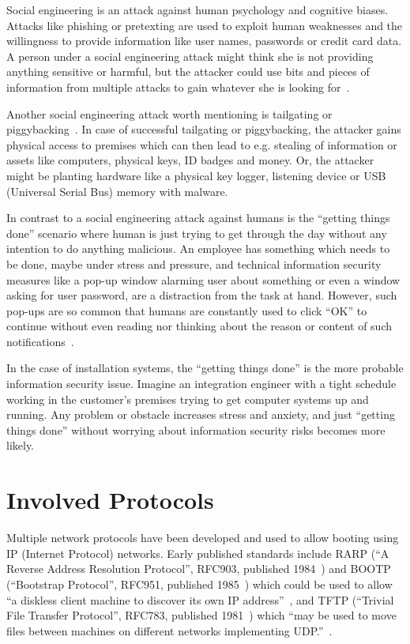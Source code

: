 Social engineering is an attack against human psychology and cognitive
biases. Attacks like phishing or pretexting are used to exploit human
weaknesses and the willingness to provide information like user names,
passwords or credit card data. A person under a social engineering
attack might think she is not providing anything sensitive or harmful,
but the attacker could use bits and pieces of information from
multiple attacks to gain whatever she is looking
for~\cite{greavu2014social}\cite{anderson}.

Another social engineering attack worth mentioning is tailgating or
piggybacking~\cite{fairbrother2014insider}. In case of successful
tailgating or piggybacking, the attacker gains physical access to
premises which can then lead to e.g. stealing of information or assets
like computers, physical keys, ID badges and money. Or, the attacker
might be planting hardware like a physical key logger, listening
device or USB (Universal Serial Bus) memory with malware.

In contrast to a social engineering attack against humans is the
``getting things done'' scenario where human is just trying to get
through the day without any intention to do anything malicious. An
employee has something which needs to be done, maybe under stress and
pressure, and technical information security measures like a pop-up
window alarming user about something or even a window asking for user
password, are a distraction from the task at hand. However, such
pop-ups are so common that humans are constantly used to click ``OK''
to continue without even reading nor thinking about the reason or
content of such notifications~\cite{anderson}.

In the case of installation systems, the ``getting things done'' is
the more probable information security issue. Imagine an integration
engineer with a tight schedule working in the customer's premises
trying to get computer systems up and running. Any problem or obstacle
increases stress and anxiety, and just ``getting things done'' without
worrying about information security risks becomes more likely.


\section{Involved Protocols}


Multiple network protocols have been developed and used to allow
booting using IP (Internet Protocol) networks. Early published
standards include RARP (``A Reverse Address Resolution Protocol'',
RFC903, published 1984~\cite{RFC903}) and BOOTP (``Bootstrap
Protocol'', RFC951, published 1985~\cite{RFC951}) which could be used
to allow ``a diskless client machine to discover its own IP
address''~\cite{RFC951}, and TFTP (``Trivial File Transfer Protocol'',
RFC783, published 1981~\cite{RFC783}) which ``may be used to move
files between machines on different networks implementing
UDP.''~\cite{RFC783}.

